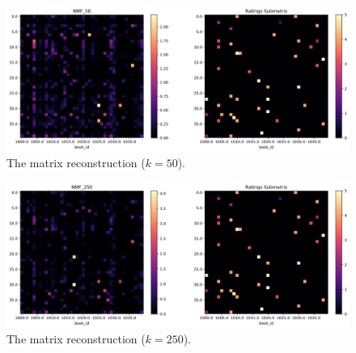 \documentclass[handout]{beamer}
\begin{document}
\begin{frame}
 \begin{figure}[t]
    \includegraphics[width=\linewidth]{../image/goodreads-models/nmf-50-left-center-close.png}
    \caption[NMF-50-left-center-close]{The matrix reconstruction ($k=50$).}
     \label{fig:nmf-50-left-center-close}
\end{figure}
\end{frame}


\begin{frame}
 \begin{figure}[t]
    \includegraphics[width=\linewidth]{../image/goodreads-models/nmf-250-left-center-close.png}
    \caption[NMF-250-left-center-close]{The matrix reconstruction ($k=250$).}
     \label{fig:nmf-250-left-center-close}
\end{figure}
\end{frame}
\end{document}
